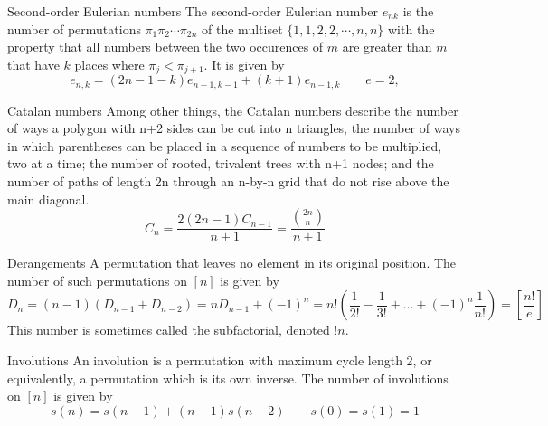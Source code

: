 \begin{algorithm}{Second-order Eulerian numbers}
\desc
The second-order Eulerian number $e_{nk}$ is the number of
permutations $\pi_1 \pi_2 \cdots \pi_{2n}$ of the multiset
$\{1,1,2,2,\cdots,n,n\}$ with the property that all numbers between
the two occurences of $m$ are greater than $m$ that have $k$ places
where $\pi_j < \pi_{j+1}$. It is given by
$$e_{n,k} = (2n-1-k)e_{n-1,k-1} + (k+1) e_{n-1, k} \qquad e=2, $$
\end{algorithm}

\begin{algorithm}{Catalan numbers}
\keyword{}
\desc
Among other things, the Catalan numbers describe the number of ways a polygon
with n+2 sides can be cut into n triangles, the number of ways in which
parentheses can be placed in a sequence of numbers to be multiplied, two at
a time; the number of rooted, trivalent trees with n+1 nodes; and the number
of paths of length 2n through an n-by-n grid that do not rise above the
main diagonal.
$$C_n = \frac{2(2n-1)C_{n-1}}{n+1} = \frac{\binom{2n}{n}}{\scriptstyle n+1}$$
\end{algorithm}

\begin{algorithm}{Derangements}
\keyword{}
\desc
A permutation that leaves no element in its original position.  The
number of such permutations on $[n]$ is given by
$$D_n = (n-1)(D_{n-1}+D_{n-2}) = nD_{n-1} + (-1)^n = n!\left(\frac
1{2!}-\frac 1{3!}+\ldots+(-1)^n\frac 1{n!}\right) =
\left[\frac{n!}{e}\right]$$
This number is sometimes called the subfactorial, denoted $!n$.
\end{algorithm}

\begin{algorithm}{Involutions}
\keyword{}
\desc
An involution is a permutation with maximum cycle length 2, or
equivalently, a permutation which is its own inverse.  The number of
involutions on $[n]$ is given by
$$s(n) = s(n-1) + (n-1)s(n-2) \qquad s(0) = s(1) = 1$$
\end{algorithm}

